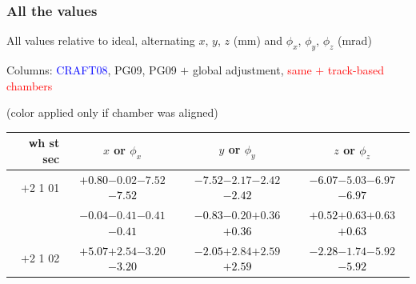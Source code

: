 \documentclass[compress]{beamer}
\begin{document}
\begin{frame}
\frametitle{All the values}
\tiny

All values relative to ideal, alternating $x$, $y$, $z$ (mm) and $\phi_x$, $\phi_y$, $\phi_z$ (mrad)

Columns: \textcolor{blue}{CRAFT08}, PG09, PG09 $+$ global adjustment, \textcolor{red}{same $+$ track-based chambers}

\hfill (color applied only if chamber was aligned)

\vfill
\renewcommand{\arraystretch}{1.1}
\begin{tabular}{r | c | c | c}
wh st sec & $x$ or $\phi_x$ & $y$ or $\phi_y$ & $z$ or $\phi_z$ \\\hline
$+$2 1 01 & \textcolor{black}{$+0.80$}\hspace{0.1 cm}$-0.02$\hspace{0.1 cm}$-7.52$\hspace{0.1 cm}\textcolor{black}{$-7.52$} & \textcolor{black}{$-7.52$}\hspace{0.1 cm}$-2.17$\hspace{0.1 cm}$-2.42$\hspace{0.1 cm}\textcolor{black}{$-2.42$} & \textcolor{black}{$-6.07$}\hspace{0.1 cm}$-5.03$\hspace{0.1 cm}$-6.97$\hspace{0.1 cm}\textcolor{black}{$-6.97$} \\
          & \textcolor{black}{$-0.04$}\hspace{0.1 cm}$-0.41$\hspace{0.1 cm}$-0.41$\hspace{0.1 cm}\textcolor{black}{$-0.41$} & \textcolor{black}{$-0.83$}\hspace{0.1 cm}$-0.20$\hspace{0.1 cm}$+0.36$\hspace{0.1 cm}\textcolor{black}{$+0.36$} & \textcolor{black}{$+0.52$}\hspace{0.1 cm}$+0.63$\hspace{0.1 cm}$+0.63$\hspace{0.1 cm}\textcolor{black}{$+0.63$} \\
$+$2 1 02 & \textcolor{black}{$+5.07$}\hspace{0.1 cm}$+2.54$\hspace{0.1 cm}$-3.20$\hspace{0.1 cm}\textcolor{black}{$-3.20$} & \textcolor{black}{$-2.05$}\hspace{0.1 cm}$+2.84$\hspace{0.1 cm}$+2.59$\hspace{0.1 cm}\textcolor{black}{$+2.59$} & \textcolor{black}{$-2.28$}\hspace{0.1 cm}$-1.74$\hspace{0.1 cm}$-5.92$\hspace{0.1 cm}\textcolor{black}{$-5.92$} \\

\end{tabular}
\end{frame}
\end{document}

